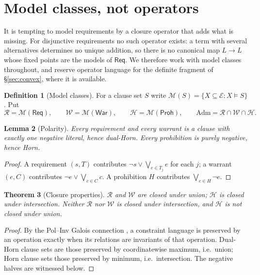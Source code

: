 \documentclass[11pt]{article}
\theoremstyle{definition}
\newtheorem{definition}{Definition}[section]
\theoremstyle{plain}
\newtheorem{theorem}[definition]{Theorem}
\newtheorem{lemma}[definition]{Lemma}
\theoremstyle{remark}
\newcommand{\Adm}{\mathrm{Adm}}
\newcommand{\El}{\mathcal{E}}
\newcommand{\Law}{\mathsf{Req}}
\newcommand{\Haz}{\mathsf{Proh}}
\newcommand{\War}{\mathsf{War}}
\begin{document}
\section{Model classes, not operators}\label{sec:models}

It is tempting to model requirements by a closure operator that adds what is
missing. For disjunctive requirements no such operator exists: a term with
several alternatives determines no unique addition, so there is no canonical
map $L \to L$ whose fixed points are the models of $\Law$. We therefore work with
model classes throughout, and reserve operator language for the definite fragment
of \S\ref{sec:convex}, where it is available.

\begin{definition}[Model classes]
For a clause set $S$ write $\mathcal{M}(S) = \{X \subseteq \El : X \models S\}$.
Put
\[
  \mathcal{R} = \mathcal{M}(\Law), \qquad
  \mathcal{W} = \mathcal{M}(\War), \qquad
  \mathcal{H} = \mathcal{M}(\Haz), \qquad
  \Adm = \mathcal{R} \cap \mathcal{W} \cap \mathcal{H}.
\]
\end{definition}

\begin{lemma}[Polarity]\label{lem:polarity}
Every requirement and every warrant is a clause with exactly one negative
literal, hence dual-Horn. Every prohibition is purely negative, hence Horn.
\end{lemma}

\begin{proof}
A requirement $(s,T)$ contributes $\neg s \vee \bigvee_{e \in T_j} e$ for each
$j$; a warrant $(e,C)$ contributes $\neg e \vee \bigvee_{c \in C} c$. A
prohibition $H$ contributes $\bigvee_{e \in H} \neg e$.
\end{proof}

\begin{theorem}[Closure properties]\label{thm:closure}
$\mathcal{R}$ and $\mathcal{W}$ are closed under union; $\mathcal{H}$ is closed
under intersection. Neither $\mathcal{R}$ nor $\mathcal{W}$ is closed under
intersection, and $\mathcal{H}$ is not closed under union.
\end{theorem}

\begin{proof}
By the Pol--Inv Galois connection \cite{geiger1968,bkkr1969}, a constraint
language is preserved by an operation exactly when its relations are invariants
of that operation. Dual-Horn clause sets are those preserved by coordinatewise
maximum, i.e.\ union; Horn clause sets those preserved by minimum, i.e.\
intersection. The negative halves are witnessed below.
\end{proof}
\end{document}
